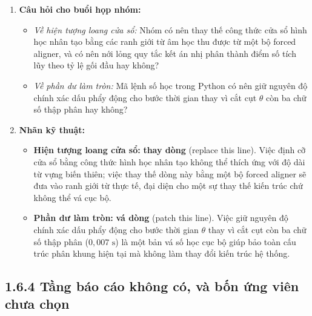 \documentclass[11pt,a4paper]{article}
\begin{document}
\begin{enumerate}
    \item \textbf{Câu hỏi cho buổi họp nhóm:}
    \begin{itemize}
        \item \textit{Về hiện tượng loang cửa sổ:} Nhóm có nên thay thế công thức cửa sổ hình học nhân tạo bằng các ranh giới từ âm học thu được từ một bộ forced aligner, và có nên nới lỏng quy tắc kết án nhị phân thành điểm số tích lũy theo tỷ lệ gối đầu hay không?
        \item \textit{Về phần dư làm tròn:} Mã lệnh số học trong Python có nên giữ nguyên độ chính xác dấu phẩy động cho bước thời gian thay vì cắt cụt $\theta$ còn ba chữ số thập phân hay không?
    \end{itemize}
    \item \textbf{Nhãn kỹ thuật:}
    \begin{itemize}
        \item \textbf{Hiện tượng loang cửa sổ:} \textbf{thay dòng} (replace this line). Việc định cỡ cửa sổ bằng công thức hình học nhân tạo không thể thích ứng với độ dài từ vựng biến thiên; việc thay thế dòng này bằng một bộ forced aligner sẽ đưa vào ranh giới từ thực tế, đại diện cho một sự thay thế kiến trúc chứ không thể vá cục bộ.
        \item \textbf{Phần dư làm tròn:} \textbf{vá dòng} (patch this line). Việc giữ nguyên độ chính xác dấu phẩy động cho bước thời gian $\theta$ thay vì cắt cụt còn ba chữ số thập phân ($0{,}007\text{ s}$) là một bản vá số học cục bộ giúp bảo toàn cấu trúc phân khung hiện tại mà không làm thay đổi kiến trúc hệ thống.
    \end{itemize}
\end{enumerate}

\subsection*{1.6.4 Tầng báo cáo không có, và bốn ứng viên chưa chọn}
\end{document}
